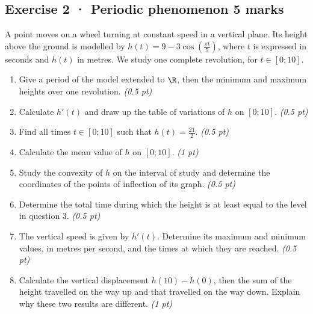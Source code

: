 \subsection*{Exercise 2 · Periodic phenomenon \hfill 5 marks}A point moves on a wheel turning at constant speed in a vertical plane. Its height above the ground is modelled by $h(t)=9-3\cos\left(\frac{\pi t}{5}\right)$, where $t$ is expressed in seconds and $h(t)$ in metres. We study one complete revolution, for $t\in[0;10]$.

\begin{enumerate}

\item Give a period of the model extended to $\R$, then the minimum and maximum heights over one revolution. \hfill\textit{(0.5 pt)}

\item Calculate $h'(t)$ and draw up the table of variations of $h$ on $[0;10]$. \hfill\textit{(0.5 pt)}

\item Find all times $t\in[0;10]$ such that $h(t)=\frac{21}{2}$. \hfill\textit{(0.5 pt)}

\item Calculate the mean value of $h$ on $[0;10]$. \hfill\textit{(1 pt)}

\item Study the convexity of $h$ on the interval of study and determine the coordinates of the points of inflection of its graph. \hfill\textit{(0.5 pt)}

\item Determine the total time during which the height is at least equal to the level in question 3. \hfill\textit{(0.5 pt)}

\item The vertical speed is given by $h'(t)$. Determine its maximum and minimum values, in metres per second, and the times at which they are reached. \hfill\textit{(0.5 pt)}

\item Calculate the vertical displacement $h(10)-h(0)$, then the sum of the height travelled on the way up and that travelled on the way down. Explain why these two results are different. \hfill\textit{(1 pt)}

\end{enumerate}

\clearpage{}\par

